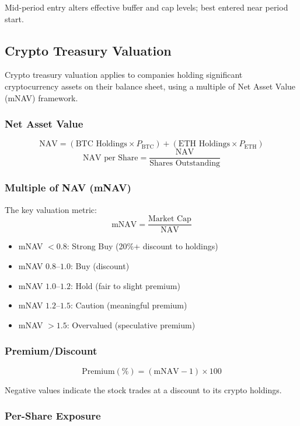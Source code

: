 Mid-period entry alters effective buffer and cap levels; best entered near period start.

\newpage\subsection{Crypto Treasury Valuation}

Crypto treasury valuation applies to companies holding significant cryptocurrency assets on their balance sheet, using a multiple of Net Asset Value (mNAV) framework.

\subsubsection{Net Asset Value}

\[
\text{NAV} = (\text{BTC Holdings} \times P_{\text{BTC}}) + (\text{ETH Holdings} \times P_{\text{ETH}})
\]
\[
\text{NAV per Share} = \frac{\text{NAV}}{\text{Shares Outstanding}}
\]

\subsubsection{Multiple of NAV (mNAV)}

The key valuation metric:
\[
\text{mNAV} = \frac{\text{Market Cap}}{\text{NAV}}
\]

\begin{itemize}
  \item[] mNAV $< 0.8$: Strong Buy (20\%+ discount to holdings)
  \item[] mNAV $0.8$--$1.0$: Buy (discount)
  \item[] mNAV $1.0$--$1.2$: Hold (fair to slight premium)
  \item[] mNAV $1.2$--$1.5$: Caution (meaningful premium)
  \item[] mNAV $> 1.5$: Overvalued (speculative premium)
\end{itemize}

\subsubsection{Premium/Discount}

\[
\text{Premium}(\%) = (\text{mNAV} - 1) \times 100
\]

Negative values indicate the stock trades at a discount to its crypto holdings.

\subsubsection{Per-Share Exposure}

